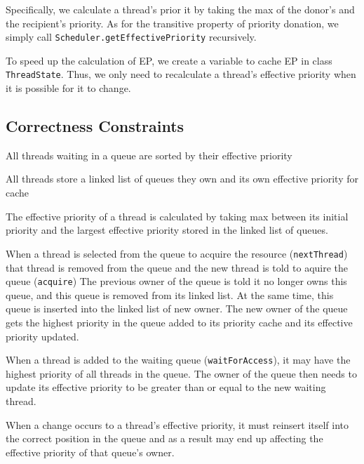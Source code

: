 \documentclass{article}
\begin{document}
\begin{spacing}{1.1}
Specifically, we calculate a thread's prior it  by taking the max of the donor's and the recipient's priority. As for the transitive property of priority donation, we simply call \texttt{Scheduler.getEffectivePriority} recursively.

To speed up the calculation of EP, we create a variable to cache EP in class \texttt{ThreadState}. Thus, we only need to recalculate a thread's effective priority when it is possible for it to change.

\subsection{Correctness Constraints}

\begin{asparaitem}
\item All threads waiting in a queue are sorted by their effective priority\\
\item All threads store a linked list of queues they own and its own effective priority for cache\\
\item The effective priority of a thread is calculated by taking max between its initial priority and the largest effective priority stored in the linked list of queues.\\
\item When a thread is selected from the queue to acquire the resource (\texttt{nextThread}) that thread is removed from the queue and the new thread is told to aquire the queue (\texttt{acquire}) The previous owner of the queue is told it no longer owns this queue, and this queue is removed from its linked list. At the same time, this queue is inserted into the linked list of new owner. The new owner of the queue gets the highest priority in the queue added to its priority cache and its effective priority updated. \\
\item When a thread is added to the waiting queue (\texttt{waitForAccess}), it may have the highest priority of all threads in the queue. The owner of the queue then needs to update its effective priority to be greater than or equal to the new waiting thread.\\
\item When a change occurs to a thread's effective priority, it must reinsert itself into the correct position in the queue and as a result may end up affecting the effective priority of that queue's owner.
\end{asparaitem}


\end{spacing}
\end{document}
